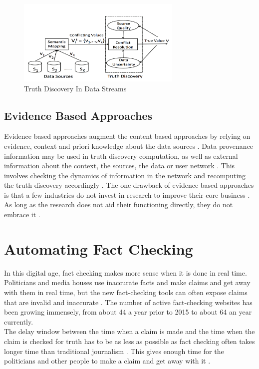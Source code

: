\documentclass[sigconf]{acmart}
\begin{document}
\begin{figure}
\includegraphics[width=0.7\textwidth]{images/fig1.png}
\caption{Truth Discovery In Data Streams \cite{Zhao2014}}
\end{figure}

\subsection{Evidence Based Approaches}
Evidence based approaches augment the content based approaches by relying on evidence, context and priori knowledge about the data sources \cite{Berti-Equille2016}. Data provenance information may be used in truth discovery computation, as well as external information about the context, the sources, the data or user network \cite{Berti-Equille2016}. This involves checking the dynamics of information in the network and recomputing the truth discovery accordingly \cite{Berti-Equille2016}. The one drawback of evidence based approaches is that a few industries do not invest in research to improve their core business \cite{www-oxford}. As long as the research does not aid their functioning directly, they do not embrace it \cite{www-oxford}.

\section{Automating Fact Checking}
In this digital age, fact checking makes more sense when it is done in real time. Politicians and media houses use inaccurate facts and make claims and get away with them in real time, but the new fact-checking tools can often expose claims that are invalid and inaccurate \cite{Hassan2015}.  The number of active fact-checking websites has been growing immensely, from about 44 a year prior to 2015 to about 64 an year currently\cite{Hassan2015}. \\
The delay window between the time when a claim is made and the time when the claim is checked for truth has to be as less as possible as fact checking often takes longer time than traditional journalism \cite{Hassan2015}. This gives enough time for the politicians and other people to make a claim and get away with it \cite{Hassan2015}.
\end{document}

